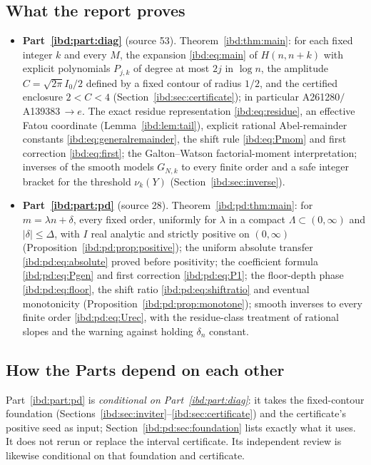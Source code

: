 \documentclass[11pt,letterpaper]{article}
\theoremstyle{remark}\newtheorem{remark}[theorem]{Remark}
\begin{document}
\subsection*{What the report proves}
\label{ibd:guide:results}
\begin{itemize}
\item \textbf{Part~\ref{ibd:part:diag}} (source 53). Theorem~\ref{ibd:thm:main}: for each fixed integer $k$ and every $M$, the expansion \eqref{ibd:eq:main} of $H(n,n+k)$ with explicit polynomials $P_{j,k}$ of degree at most $2j$ in $\log n$, the amplitude $C=\sqrt{2\pi}I_0/2$ defined by a fixed contour of radius $1/2$, and the certified enclosure $2<C<4$ (Section~\ref{ibd:sec:certificate}); in particular A261280$/$A139383$\,\to e$. The exact residue representation \eqref{ibd:eq:residue}, an effective Fatou coordinate (Lemma~\ref{ibd:lem:tail}), explicit rational Abel-remainder constants \eqref{ibd:eq:generalremainder}, the shift rule \eqref{ibd:eq:Pmom} and first correction \eqref{ibd:eq:first}; the Galton--Watson factorial-moment interpretation; inverses of the smooth models $G_{N,k}$ to every finite order and a safe integer bracket for the threshold $\nu_k(Y)$ (Section~\ref{ibd:sec:inverse}).
\item \textbf{Part~\ref{ibd:part:pd}} (source 28). Theorem~\ref{ibd:pd:thm:main}: for $m=\lambda n+\delta$, every fixed order, uniformly for $\lambda$ in a compact $\Lambda\subset(0,\infty)$ and $|\delta|\le\Delta$, with $I$ real analytic and strictly positive on $(0,\infty)$ (Proposition~\ref{ibd:pd:prop:positive}); the uniform absolute transfer \eqref{ibd:pd:eq:absolute} proved before positivity; the coefficient formula \eqref{ibd:pd:eq:Pgen} and first correction \eqref{ibd:pd:eq:P1}; the floor-depth phase \eqref{ibd:pd:eq:floor}, the shift ratio \eqref{ibd:pd:eq:shiftratio} and eventual monotonicity (Proposition~\ref{ibd:pd:prop:monotone}); smooth inverses to every finite order \eqref{ibd:pd:eq:Urec}, with the residue-class treatment of rational slopes and the warning against holding $\delta_n$ constant.
\end{itemize}

\subsection*{How the Parts depend on each other}
\label{ibd:guide:dependencies}
Part~\ref{ibd:part:pd} is \emph{conditional on Part~\ref{ibd:part:diag}}: it takes the fixed-contour foundation (Sections~\ref{ibd:sec:inviter}--\ref{ibd:sec:certificate}) and the certificate's positive seed as input; Section~\ref{ibd:pd:sec:foundation} lists exactly what it uses. It does not rerun or replace the interval certificate. Its independent review is likewise conditional on that foundation and certificate.
\end{document}
